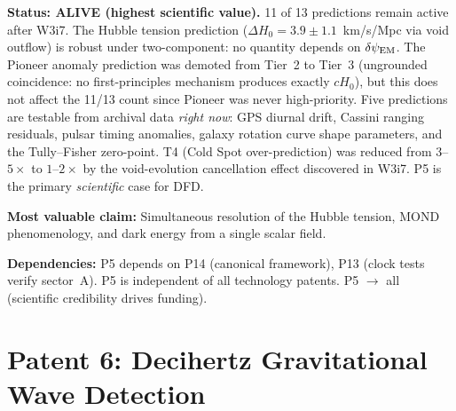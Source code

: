 \documentclass[11pt]{article}
\newcommand{\dpsiEM}{\delta\psi_{\rm EM}}
\begin{document}
\begin{tcolorbox}[colback=green!5!white, colframe=green!40!black,
  title=\textbf{P5: ALIVE --- Resource Allocation: 4/5}]
\textbf{Status: ALIVE (highest scientific value).}
11 of 13 predictions remain active after W3i7. The Hubble tension
prediction ($\Delta H_0 = 3.9 \pm 1.1$~km/s/Mpc via void outflow)
is robust under two-component: no quantity depends on $\dpsiEM$.
The Pioneer anomaly prediction was demoted from Tier~2 to Tier~3
(ungrounded coincidence: no first-principles mechanism produces
exactly $c H_0$), but this does not affect the 11/13 count since
Pioneer was never high-priority. Five predictions are testable from
archival data \emph{right now}: GPS diurnal drift, Cassini ranging
residuals, pulsar timing anomalies, galaxy rotation curve shape
parameters, and the Tully--Fisher zero-point. T4 (Cold Spot
over-prediction) was reduced from $3$--$5\times$ to $1$--$2\times$
by the void-evolution cancellation effect discovered in W3i7.
P5 is the primary \emph{scientific} case for DFD.

\textbf{Most valuable claim:} Simultaneous resolution of the Hubble
tension, MOND phenomenology, and dark energy from a single scalar field.

\textbf{Dependencies:} P5 depends on P14 (canonical framework), P13
(clock tests verify sector~A). P5 is independent of all technology
patents. P5 $\to$ all (scientific credibility drives funding).
\end{tcolorbox}

\section{Patent 6: Decihertz Gravitational Wave Detection}
\label{sec:P6}
\end{document}
